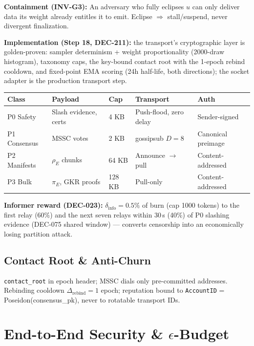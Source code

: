 \documentclass[11pt, a4paper]{article}
\begin{document}
\textbf{Containment (INV-G3):} An adversary who fully eclipses $u$ can only deliver data its weight already entitles it to emit. Eclipse $\Rightarrow$ stall/suspend, never divergent finalization.

\textbf{Implementation (Step 18, DEC-211):} the transport's cryptographic layer is golden-proven:
sampler determinism + weight proportionality (2000-draw histogram), taxonomy caps, the key-bound
contact root with the 1-epoch rebind cooldown, and fixed-point EMA scoring (24h half-life, both
directions); the socket adapter is the production transport step.



\begin{center}
\begin{tabular}{l|l|l|l|l}
\textbf{Class} & \textbf{Payload} & \textbf{Cap} & \textbf{Transport} & \textbf{Auth} \\
\hline
P0 Safety & Slash evidence, certs & 4 KB & Push-flood, zero delay & Sender-signed \\
P1 Consensus & MSSC votes & 2 KB & gossipsub $D=8$ & Canonical preimage \\
P2 Manifests & $\rho_E$ chunks & 64 KB & Announce $\to$ pull & Content-addressed \\
P3 Bulk & $\pi_E$, GKR proofs & 128 KB & Pull-only & Content-addressed \\
\end{tabular}
\end{center}

\textbf{Informer reward (DEC-023):} $\delta_{\text{info}} = 0.5\%$ of burn (cap 1000 tokens) to the first relay (60\%) and the next seven relays within 30\,s (40\%) of P0 slashing evidence (DEC-075 shared window) --- converts censorship into an economically losing partition attack.

\subsection{Contact Root \& Anti-Churn}

\texttt{contact\_root} in epoch header; MSSC dials only pre-committed addresses. Rebinding cooldown $\Delta_{\text{rebind}} = 1$ epoch; reputation bound to \texttt{AccountID} = \textsf{Poseidon}(\textsf{consensus\_pk}), never to rotatable transport IDs.

\section{End-to-End Security \& $\epsilon$-Budget}
\end{document}
